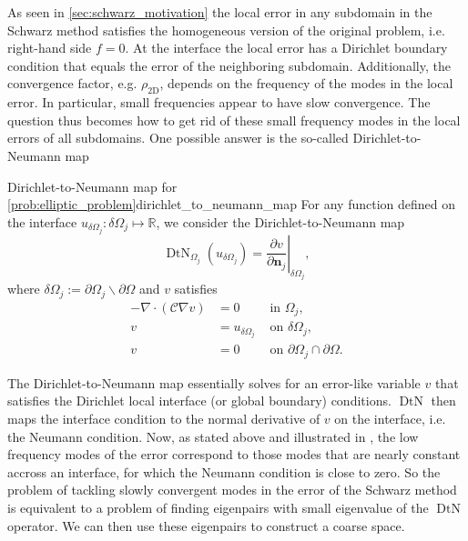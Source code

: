 As seen in \cref{sec:schwarz_motivation} the local error in any subdomain in the Schwarz method satisfies the homogeneous version of the original problem, i.e. right-hand side $f = 0$. At the interface the local error has a Dirichlet boundary condition that equals the error of the neighboring subdomain. Additionally, the convergence factor, e.g. $\rho_{\text{2D}}$, depends on the frequency of the modes in the local error. In particular, small frequencies appear to have slow convergence. The question thus becomes how to get rid of these small frequency modes in the local errors of all subdomains. One possible answer is the so-called Dirichlet-to-Neumann map \cite[Definition 5.1]{schwarz_methods_Dolean_2015}
\begin{fancydef}{Dirichlet-to-Neumann map for \cref{prob:elliptic_problem}}{dirichlet_to_neumann_map}
  For any function defined on the interface $u_{\delta\Omega_j}: \delta\Omega_j \mapsto \mathbb{R}$, we consider the Dirichlet-to-Neumann map
  \[
    \operatorname{DtN}_{\Omega_j}\left(u_{\delta\Omega_j}\right)=\left.\frac{\partial v}{\partial \mathbf{n}_j}\right|_{\delta\Omega_j},
  \]
  where $\delta\Omega_j:=\partial \Omega_j \backslash \partial \Omega$ and $v$ satisfies
  \begin{equation}
    \begin{aligned}
      -\nabla\cdot\left(\mathcal{C}\nabla v\right) & =0            & \text { in } \Omega_j,                               \\
      v                                            & =u_{\delta\Omega_j} & \text { on } \delta\Omega_j,                               \\
      v                                            & =0            & \text { on } \partial \Omega_j \cap \partial \Omega.
    \end{aligned}
    \label{eq:dirichlet_to_neumann_map_subproblem}
  \end{equation}
\end{fancydef}

The Dirichlet-to-Neumann map essentially solves for an error-like variable $v$ that satisfies the Dirichlet local interface (or global boundary) conditions. $\operatorname{DtN}$ then maps the interface condition to the normal derivative of $v$ on the interface, i.e. the Neumann condition. Now, as stated above and illustrated in \cite[Figure 5.2]{schwarz_methods_Dolean_2015}, the low frequency modes of the error correspond to those modes that are nearly constant accross an interface, for which the Neumann condition is close to zero. So the problem of tackling slowly convergent modes in the error of the Schwarz method is equivalent to a problem of finding eigenpairs with small eigenvalue of the $\operatorname{DtN}$ operator. We can then use these eigenpairs to construct a coarse space.

